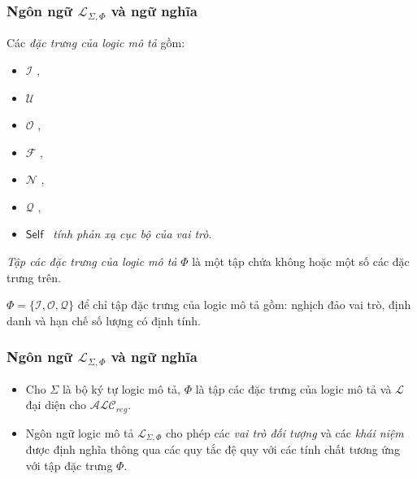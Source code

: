 \documentclass[fleqn]{beamer}
\newcommand{\mL}		{\mathcal{L}}
\newcommand{\mI}		{\mathcal{I}}
\newcommand{\mO}		{\mathcal{O}}
\newcommand{\mN}		{\mathcal{N}}
\newcommand{\mQ}		{\mathcal{Q}}
\newcommand{\mF}		{\mathcal{F}}
\newcommand{\mU}		{\mathcal{U}}
\newcommand{\Self}		{\mathsf{Self}}
\newcommand{\mLSP}		{\mL_{\Sigma,\Phi}}
\newcommand{\ALCreg}	{$\mathcal{ALC}_{reg}$\xspace}
\begin{document}
\begin{frame}\frametitle{\bf Ngôn ngữ $\mLSP$ và ngữ nghĩa}
	Các {\em đặc trưng của logic mô tả} gồm:
	
	\vspace{1.0ex}
	\begin{itemize}
		\item $\mI$ , 
		\vspace{1.0ex}
		
		\item $\mU$ 
		\vspace{1.0ex}
		
		\item $\mO$ , 
		\vspace{1.0ex}
		
		\item $\mF$ ,
		\vspace{1.0ex}
		
		\item $\mN$ , 
		\vspace{1.0ex}
		
		\item $\mQ$ ,
		\vspace{1.0ex}
		
		\item $\Self$ \quad\,\!\! {\em tính phản xạ cục bộ của vai trò}.
	\end{itemize}
	
	{\em Tập các đặc trưng của logic mô tả} $\Phi$ là một tập chứa không hoặc một số các đặc trưng trên. 
	
	\vspace{1.0ex}
	$\Phi = \{\mI, \mO, \mQ\}$ để chỉ tập đặc trưng của logic mô tả gồm: nghịch đảo vai trò, định danh và hạn chế số lượng có định tính.
\end{frame}

\begin{frame}\frametitle{\bf Ngôn ngữ $\mLSP$ và ngữ nghĩa}
	\begin{itemize}  
		\item Cho $\Sigma$ là bộ ký tự logic mô tả, $\Phi$ là tập các đặc trưng của logic mô tả và $\mL$ đại diện cho \ALCreg. 
		\vspace{1.0ex}
		
		\item Ngôn ngữ logic mô tả $\mLSP$ cho phép các {\em vai trò đối tượng} và các {\em khái niệm} được định nghĩa thông qua các quy tắc đệ quy với các tính chất tương ứng với tập đặc trưng $\Phi$.
	\end{itemize}
	
\end{frame}
\end{document}
